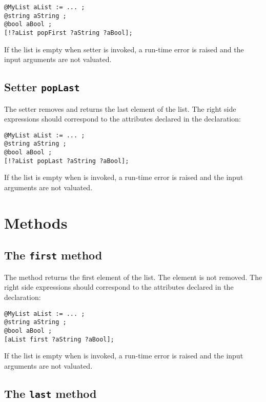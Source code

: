 \begin{lstlisting}[language=galgas]
@MyList aList := ... ;
@string aString ;
@bool aBool ;
[!?aList popFirst ?aString ?aBool];
\end{lstlisting}

If the list is empty when  setter is invoked, a run-time error is raised and the input arguments are not valuated.

\subsection{Setter \texttt{popLast}}


The  setter removes and returns the last element of the list. The right side expressions should correspond to the attributes declared in the  declaration:

\begin{lstlisting}[language=galgas]
@MyList aList := ... ;
@string aString ;
@bool aBool ;
[!?aList popLast ?aString ?aBool];
\end{lstlisting}

If the list is empty when  is invoked, a run-time error is raised and the input arguments are not valuated.

\section{Methods}

\subsection{The \texttt{first} method}

The  method returns the first element of the list. The element is not removed. The right side expressions should correspond to the attributes declared in the  declaration:

\begin{lstlisting}[language=galgas]
@MyList aList := ... ;
@string aString ;
@bool aBool ;
[aList first ?aString ?aBool];
\end{lstlisting}

If the list is empty when  is invoked, a run-time error is raised and the input arguments are not valuated.

\subsection{The \texttt{last} method}

